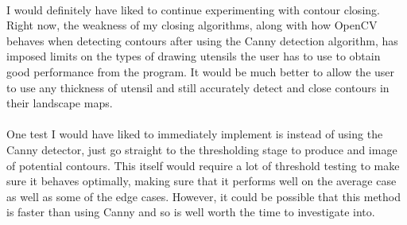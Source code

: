 \documentclass[11pt]{article}
\begin{document}
\\
I would definitely have liked to continue experimenting with contour closing.
Right now, the weakness of my closing algorithms, along with how OpenCV
behaves when detecting contours after using the Canny detection algorithm, 
has imposed limits on the types of drawing utensils the user has to use to
obtain good performance from the program. It would be much
better to allow the user to use any thickness of utensil and still 
accurately detect and close contours in their landscape maps.\\
\\
One test I would have liked to immediately implement is instead of using
the Canny detector, just go straight to the thresholding stage to produce
and image of potential contours. This itself would require a lot of
threshold testing to make sure it behaves optimally, making sure that
it performs well on the average case as well as some of the edge cases.
However, it could be possible that this method is faster than using Canny
and so is well worth the time to investigate into. 
\end{document}
